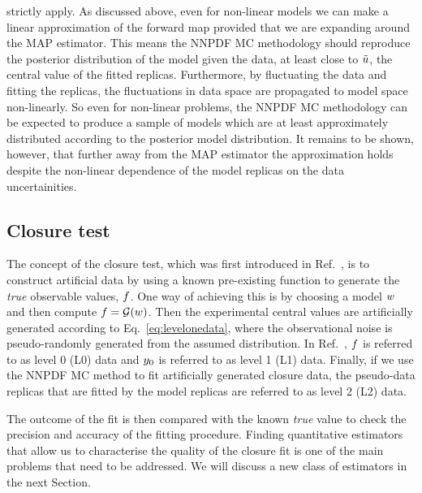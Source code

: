 strictly apply. As discussed above,
even for non-linear models we can make a linear approximation of the forward map
provided that we are expanding around the MAP estimator. This means the NNPDF MC
methodology should reproduce the posterior distribution of the model given the
data, at least close to $\tilde{u}$, the central value of the fitted replicas.
Furthermore, by fluctuating the data and fitting the replicas, the fluctuations
in data space are propagated to model space non-linearly. So even for non-linear
problems, the NNPDF MC methodology can be expected to produce a sample of models which are at
least approximately distributed according to the posterior model distribution.
It remains to be shown, however,
that further away from the MAP estimator the approximation holds
despite the non-linear dependence of the model replicas on the data
uncertainities.

\subsection{Closure test}
\label{sec:closure-test-intro}

The concept of the closure test, which was first introduced in
Ref.~\cite{nnpdf30}, is to construct artificial data by using a known
pre-existing function to generate the {\em true} observable values, $f$. One
way of achieving this is by choosing a model $w$ and then compute $f
= \mathcal{G}(w)$. Then the experimental central values are artificially
generated according to Eq.~\ref{eq:levelonedata}, where the observational noise
is pseudo-randomly generated from the assumed distribution. In
Ref.~\cite{nnpdf30}, $f$ is referred to as level 0 (L0) data and
$y_0$ is referred to as level 1 (L1) data. Finally, if we use the
NNPDF MC method to fit artificially generated closure data, the pseudo-data
replicas that are fitted by the model replicas are referred to as level 2 (L2)
data.

The outcome of the fit is then compared with the known {\em true} value to check
the precision and accuracy of the fitting procedure. Finding quantitative
estimators that allow us to characterise the quality of the closure fit is one
of the main problems that need to be addressed. We will discuss a new class of
estimators in the next Section. 

